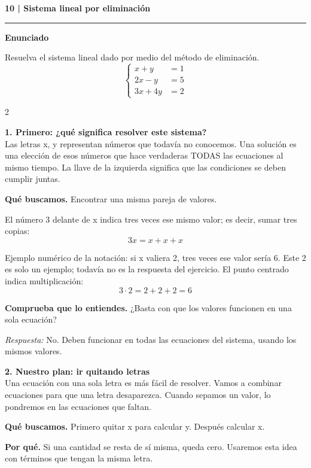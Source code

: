 \documentclass[11pt,a4paper,landscape]{article}
\newcommand{\titulo}[1]{{\LARGE\bfseries #1}\par\smallskip\hrule\medskip}
\begin{document}
\newpage{}\hypertarget{1.1-10}{}
\titulo{10 | Sistema lineal por eliminación}
\textbf{Enunciado}\par Resuelva el sistema lineal dado por medio del método de eliminación.
\[\left\{\begin{aligned}x + y &= 1\\2x - y &= 5\\3x + 4y &= 2\end{aligned}\right.\]
\begin{multicols*}{2}
\noindent\begin{minipage}{\linewidth}\textbf{1. Primero: ¿qué significa resolver este sistema?}\\[2pt]Las letras x, y representan números que todavía no conocemos. Una solución es una elección de esos números que hace verdaderas TODAS las ecuaciones al mismo tiempo. La llave de la izquierda significa que las condiciones se deben cumplir juntas.
\par\smallskip\textbf{Qué buscamos.} Encontrar una misma pareja de valores.
\par\smallskip El número 3 delante de x indica tres veces ese mismo valor; es decir, sumar tres copias:
\[3x=x+x+x\]
\par\smallskip Ejemplo numérico de la notación: si x valiera 2, tres veces ese valor sería 6. Este 2 es solo un ejemplo; todavía no es la respuesta del ejercicio. El punto centrado indica multiplicación:
\[3\cdot 2=2+2+2=6\]
\par\smallskip\textbf{Comprueba que lo entiendes.} ¿Basta con que los valores funcionen en una sola ecuación?\par\textit{Respuesta:} No. Deben funcionar en todas las ecuaciones del sistema, usando los mismos valores.
\end{minipage}\par\medskip
\noindent\begin{minipage}{\linewidth}\textbf{2. Nuestro plan: ir quitando letras}\\[2pt]Una ecuación con una sola letra es más fácil de resolver. Vamos a combinar ecuaciones para que una letra desaparezca. Cuando sepamos un valor, lo pondremos en las ecuaciones que faltan.
\par\smallskip\textbf{Qué buscamos.} Primero quitar x para calcular y. Después calcular x.
\par\smallskip\textbf{Por qué.} Si una cantidad se resta de sí misma, queda cero. Usaremos esta idea con términos que tengan la misma letra.

\end{minipage}
\end{multicols*}
\end{document}
